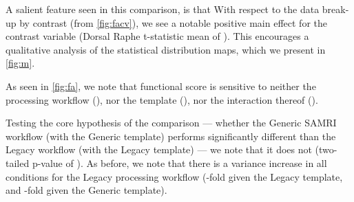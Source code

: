 A salient feature seen in this comparison, is that With respect to the data break-up by contrast (from \cref{fig:facv}), we see a notable positive main effect for the contrast variable
(Dorsal Raphe t-statistic mean of
).
This encourages a qualitative analysis of the statistical distribution maps, which we present in \cref{fig:m}.

As seen in \cref{fig:fa}, we note that functional score is sensitive to neither
the processing workflow
(),
nor the template
(),
nor the interaction thereof
().

Testing the core hypothesis of the comparison ---
whether the Generic SAMRI workflow (with the Generic template) performs significantly different than the Legacy workflow (with the Legacy template) ---
we note that it does not
(two-tailed p-value of
).
As before, we note that there is a variance increase in all conditions for the Legacy processing workflow
(-fold
given the Legacy template, and
-fold
given the Generic template).
